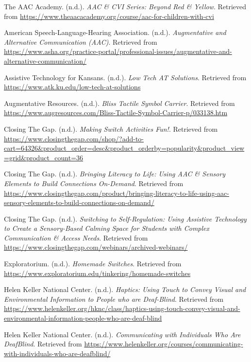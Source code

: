 \begin{thebibliography}{99}

 The AAC Academy. (n.d.). \textit{AAC \& CVI Series: Beyond Red \& Yellow}. Retrieved from \url{https://www.theaacacademy.org/course/aac-for-children-with-cvi}

 American Speech-Language-Hearing Association. (n.d.). \textit{Augmentative and Alternative Communication (AAC)}. Retrieved from \url{https://www.asha.org/practice-portal/professional-issues/augmentative-and-alternative-communication/}

 Assistive Technology for Kansans. (n.d.). \textit{Low Tech AT Solutions}. Retrieved from \url{https://www.atk.ku.edu/low-tech-at-solutions}

 Augmentative Resources. (n.d.). \textit{Bliss Tactile Symbol Carrier}. Retrieved from \url{https://www.augresources.com/Bliss-Tactile-Symbol-Carrier-p/033138.htm}

 Closing The Gap. (n.d.). \textit{Making Switch Activities Fun!}. Retrieved from \url{https://www.closingthegap.com/shop/?add-to-cart=64326&product_order=desc&product_orderby=popularity&product_view=grid&product_count=36}

 Closing The Gap. (n.d.). \textit{Bringing Literacy to Life: Using AAC \& Sensory Elements to Build Connections On-Demand}. Retrieved from \url{https://www.closingthegap.com/product/bringing-literacy-to-life-using-aac-sensory-elements-to-build-connections-on-demand/}

 Closing The Gap. (n.d.). \textit{Switching to Self-Regulation: Using Assistive Technology to Create a Sensory-Based Calming Space for Students with Complex Communication \& Access Needs}. Retrieved from \url{https://www.closingthegap.com/webinars/archived-webinars/}

 Exploratorium. (n.d.). \textit{Homemade Switches}. Retrieved from \url{https://www.exploratorium.edu/tinkering/homemade-switches}

 Helen Keller National Center. (n.d.). \textit{Haptics: Using Touch to Convey Visual and Environmental Information to People who are Deaf-Blind}. Retrieved from \url{https://www.helenkeller.org/hknc/class/haptics-using-touch-convey-visual-and-environmental-information-people-who-are-deaf-blind}

 Helen Keller National Center. (n.d.). \textit{Communicating with Individuals Who Are DeafBlind}. Retrieved from \url{https://www.helenkeller.org/courses/communicating-with-individuals-who-are-deafblind/}


\end{thebibliography}

